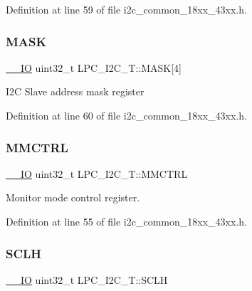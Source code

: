 Definition at line 59 of file i2c\+\_\+common\+\_\+18xx\+\_\+43xx.\+h.

\mbox{\label{struct_l_p_c___i2_c___t_a9e734d7a24b7a02ac1887608552b9c69}} 
\subsubsection{\texorpdfstring{M\+A\+SK}{MASK}}
{\footnotesize\ttfamily \hyperlink{core__sc300_8h_aec43007d9998a0a0e01faede4133d6be}{\+\_\+\+\_\+\+IO} uint32\+\_\+t L\+P\+C\+\_\+\+I2\+C\+\_\+\+T\+::\+M\+A\+SK\mbox{[}4\mbox{]}}

I2C Slave address mask register 

Definition at line 60 of file i2c\+\_\+common\+\_\+18xx\+\_\+43xx.\+h.

\mbox{\label{struct_l_p_c___i2_c___t_ace2d21c2a5042f1355f98b2e687ae8c1}} 
\subsubsection{\texorpdfstring{M\+M\+C\+T\+RL}{MMCTRL}}
{\footnotesize\ttfamily \hyperlink{core__sc300_8h_aec43007d9998a0a0e01faede4133d6be}{\+\_\+\+\_\+\+IO} uint32\+\_\+t L\+P\+C\+\_\+\+I2\+C\+\_\+\+T\+::\+M\+M\+C\+T\+RL}

Monitor mode control register. 

Definition at line 55 of file i2c\+\_\+common\+\_\+18xx\+\_\+43xx.\+h.

\mbox{\label{struct_l_p_c___i2_c___t_a73be20e257e178ea0deafd0057cc7900}} 
\subsubsection{\texorpdfstring{S\+C\+LH}{SCLH}}
{\footnotesize\ttfamily \hyperlink{core__sc300_8h_aec43007d9998a0a0e01faede4133d6be}{\+\_\+\+\_\+\+IO} uint32\+\_\+t L\+P\+C\+\_\+\+I2\+C\+\_\+\+T\+::\+S\+C\+LH}

